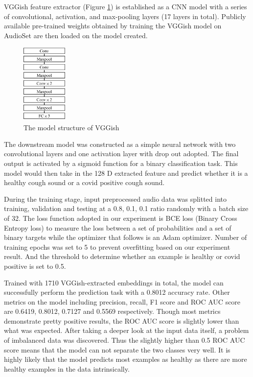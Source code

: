 \documentclass[11pt]{article}
\begin{document}
VGGish feature extractor (Figure \ref{fig:vggish}) is established as a CNN model with a series of convolutional, activation, and max-pooling layers (17 layers in total). Publicly available pre-trained weights obtained by training the VGGish model on AudioSet are then loaded on the model created. 

\begin{figure}[htbp]{}
	\centering
    \includegraphics[width=0.2\textwidth]{./imgs/vggish.png} %
    \caption{The model structure of VGGish}
    \label{fig:vggish}
\end{figure}

The downstream model was constructed as a simple neural network with two convolutional layers and one activation layer with drop out adopted. The final output is activated by a sigmoid function for a binary classification task. This model would then take in the 128 D extracted feature and predict whether it is a healthy cough sound or a covid positive cough sound. 

During the training stage, input preprocessed audio data was splitted into training, validation and testing at a 0.8, 0.1, 0.1 ratio randomly with a batch size of 32. The loss function adopted in our experiment is BCE loss (Binary Cross Entropy loss) to measure the loss between a set of probabilities and a set of binary targets while the optimizer that follows is an Adam optimizer. Number of training epochs was set to 5 to prevent overfitting based on our experiment result. And the threshold to determine whether an example is healthy or covid positive is set to 0.5.

Trained with 1710 VGGish-extracted embeddings in total, the model can successfully perform the prediction task with a 0.8012 accuracy rate. Other metrics on the model including precision, recall, F1 score and ROC AUC score are 0.6419, 0.8012, 0.7127 and 0.5569 respectively. Though most metrics demonstrate pretty positive results, the ROC AUC score is slightly lower than what was expected. After taking a deeper look at the input data itself, a problem of imbalanced data was discovered. Thus the slightly higher than 0.5 ROC AUC score means that the model can not separate the two classes very well. It is highly likely that the model predicts most examples as healthy as there are more healthy examples in the data intrinsically.
\end{document}
